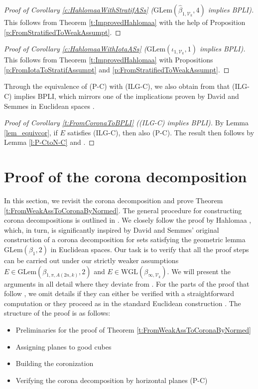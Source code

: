 \documentclass[12pt]{amsart}
\numberwithin{equation}{section}
\theoremstyle{plain}
\theoremstyle{definition}
\theoremstyle{remark}
\begin{document}
\begin{proof}[Proof of Corollary \ref{c:HahlomaaWithStratifASs}  ($\mathrm{GLem}(\widehat{\beta}_{1,\mathcal{V}_k},4)$ implies BPLI)]
    This follows from Theorem \ref{t:ImprovedHahlomaa} with the help of Proposition \ref{p:FromStratifiedToWeakAssumpt}.
\end{proof}



\begin{proof}[Proof of Corollary \ref{c:HahlomaaWithIotaASs} ($\mathrm{GLem}(\iota_{1,\mathcal{V}_k},1)$ implies BPLI)]
    This follows from Theorem \ref{t:ImprovedHahlomaa} with  Propositions \ref{p:FromIotaToStratifAssumpt} and \ref{p:FromStratifiedToWeakAssumpt}.
    \end{proof}
Through the equivalence of (P-C) with (ILG-C), we also obtain from \cite{Bate} that (ILG-C) implies BPLI, which mirrors one of the implications proven by David and Semmes in Euclidean spaces \cite{David1}. 
\begin{proof}[Proof of Corollary \ref{t:FromCoronaToBPLI} ((ILG-C) implies BPLI)]
By Lemma \ref{lem_equivcor}, if $E$ satisfies (ILG-C), then also (P-C). The result then follows by 
 Lemma \ref{l:P-CtoN-C} and \cite[Theorem B]{Bate}. 
\end{proof}


\section{Proof of the corona decomposition}\label{s:ProofCorona}

In this section, we revisit the corona decomposition and  prove Theorem \ref{t:FromWeakAssToCoronaByNormed}. The general procedure for constructing corona decompositions is outlined in \cite[p.19]{David1}.  We closely follow the proof by Hahlomaa \cite[p.5-17]{Hahlomaa}, which, in turn, is significantly inspired by David and Semmes' original construction of a corona decomposition for sets satisfying the geometric lemma $\mathrm{GLem}(\beta_1,2)$ in Euclidean spaces. Our task is to verify that all the proof steps can be carried out under our strictly weaker assumptions $E\in \mathrm{GLem}(\beta_{1,\pi,A(2n,k)},2)$ and $E\in \mathrm{WGL}(\beta_{\infty,\mathcal{V}_k})$. We will present the arguments in all detail where they deviate from \cite{Hahlomaa}. For the parts of the proof that follow \cite{Hahlomaa}, we omit details if they can either be verified with a straightforward computation or they proceed as in the standard Euclidean construction  \cite{David1}. The structure of the proof is as follows:
\begin{itemize}
    \item[\ref{ss:PrelimThm}] Preliminaries for the proof of Theorem \ref{t:FromWeakAssToCoronaByNormed}
    \item[\ref{ss:CoronaStep1}] Assigning planes to good cubes
   \item[\ref{ss:BuildingCoronization}] Building the coronization
\item[\ref{ss:VerifP-C}] Verifying the corona decomposition by horizontal planes (P-C)
\end{itemize}
\end{document}
